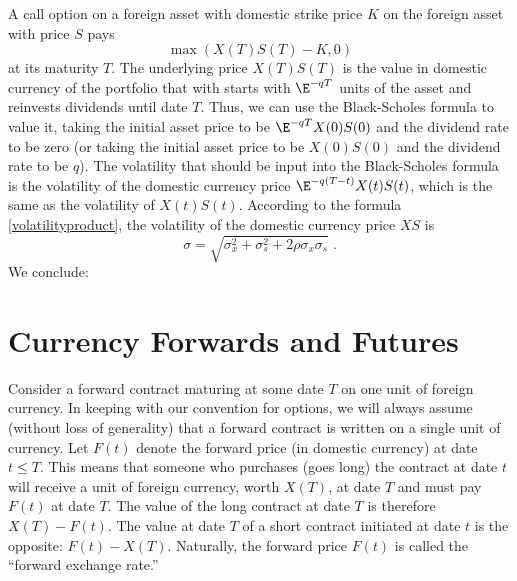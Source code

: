 A call option on a foreign asset with domestic strike price $K$ on the foreign asset with price $S$ pays
$$\max(X(T)S(T)-K,0)$$
at its maturity $T$.  The underlying price $X(T)S(T)$ is the value in domestic currency of the portfolio that with starts with $\E^{-qT}$ units of the asset and reinvests dividends until date $T$.  Thus, we can use the Black-Scholes formula to value it, taking the initial asset price to be $\E^{-qT}X(0)S(0)$ and the dividend rate to be zero (or taking the initial asset price to be $X(0)S(0)$ and the dividend rate to be $q$).  The volatility that should be input into the Black-Scholes formula is the volatility of the domestic currency price $\E^{-q(T-t)}X(t)S(t)$, which is the same as the volatility of $X(t)S(t)$.  
According to the formula \eqref{volatilityproduct}, the volatility of the domestic currency price $XS$ is 
\begin{equation}\label{foreignoptiondomcurrencyvol}
\sigma = \sqrt{\sigma_x^2+\sigma_s^2+2\rho\sigma_x\sigma_s}\;.
\end{equation}
We conclude:

\section{Currency Forwards and Futures}\label{s_currencyforwards}

Consider a forward contract maturing at some date $T$ on one unit of foreign currency.   In keeping with our convention for options, we will always assume (without loss of generality) that a forward contract is written on a single unit of currency.  Let $F(t)$ denote the forward price (in domestic currency) at date $t\leq T$.  This means that someone who purchases (goes long) the contract at date $t$ will receive a unit of foreign currency, worth $X(T)$, at date $T$ and must pay $F(t)$ at date $T$.   The value of the long contract at date $T$ is therefore $X(T) - F(t)$.  The value at date $T$ of a short contract initiated at date $t$ is the opposite: $F(t)-X(T)$.  Naturally, the forward price $F(t)$ is called the ``forward exchange rate.'' 

